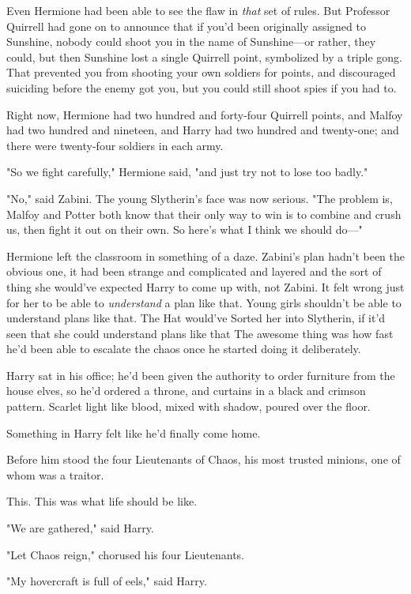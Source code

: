Even Hermione had been able to see the flaw in \emph{that} set of rules. But
Professor Quirrell had gone on to announce that if you'd been originally
assigned to Sunshine, nobody could shoot you in the name of Sunshine---or
rather, they could, but then Sunshine lost a single Quirrell point, symbolized
by a triple gong. That prevented you from shooting your own soldiers for
points, and discouraged suiciding before the enemy got you, but you could still
shoot spies if you had to.

Right now, Hermione had two hundred and forty-four Quirrell points, and Malfoy
had two hundred and nineteen, and Harry had two hundred and twenty-one; and
there were twenty-four soldiers in each army.

"So we fight carefully," Hermione said, "and just try not to lose too badly."

"No," said Zabini. The young Slytherin's face was now serious. "The problem is,
Malfoy and Potter both know that their only way to win is to combine and crush
us, then fight it out on their own. So here's what I think we should do---"

Hermione left the classroom in something of a daze. Zabini's plan hadn't been
the obvious one, it had been strange and complicated and layered and the sort
of thing she would've expected Harry to come up with, not Zabini. It felt wrong
just for her to be able to \emph{understand} a plan like that. Young girls
shouldn't be able to understand plans like that. The Hat would've Sorted her
into Slytherin, if it'd seen that she could understand plans like that{\el}
\sbreak
The awesome thing was how fast he'd been able to escalate the chaos once he
started doing it deliberately.

Harry sat in his office; he'd been given the authority to order furniture from
the house elves, so he'd ordered a throne, and curtains in a black and crimson
pattern. Scarlet light like blood, mixed with shadow, poured over the floor.

Something in Harry felt like he'd finally come home.

Before him stood the four Lieutenants of Chaos, his most trusted minions, one
of whom was a traitor.

This. This was what life should be like.

"We are gathered," said Harry.

"Let Chaos reign," chorused his four Lieutenants.

"My hovercraft is full of eels," said Harry.

